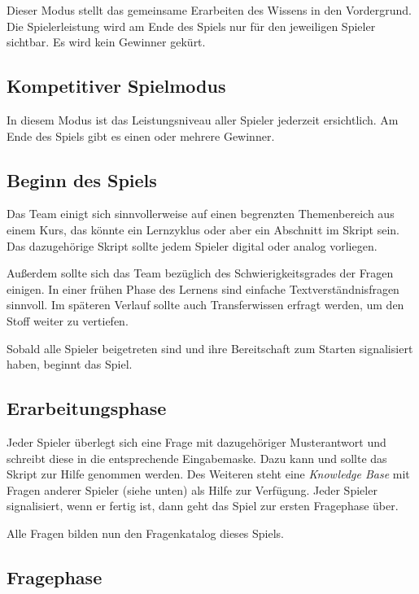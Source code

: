 \documentclass[a4paper,11pt,listof=numbered,glossary=totoc,parskip=half,toc=bib]{scrreprt}
\begin{document}
Dieser Modus stellt das gemeinsame Erarbeiten des Wissens in den Vordergrund. Die Spielerleistung wird am Ende des Spiels nur für den jeweiligen Spieler sichtbar. Es wird kein Gewinner gekürt.

\subsection{Kompetitiver Spielmodus}

In diesem Modus ist das Leistungsniveau aller Spieler jederzeit ersichtlich. Am Ende des Spiels gibt es einen oder mehrere Gewinner.


\subsection{Beginn des Spiels}

Das Team einigt sich sinnvollerweise auf einen begrenzten Themenbereich aus einem Kurs, das könnte ein Lernzyklus oder aber ein Abschnitt im Skript sein. Das dazugehörige Skript sollte jedem Spieler digital oder analog vorliegen.

Außerdem sollte sich das Team bezüglich des Schwierigkeitsgrades der Fragen einigen. In einer frühen Phase des Lernens sind einfache Textverständnisfragen sinnvoll. Im späteren Verlauf sollte auch Transferwissen erfragt werden, um den Stoff weiter zu vertiefen.

Sobald alle Spieler beigetreten sind und ihre Bereitschaft zum Starten signalisiert haben, beginnt das Spiel. 



\subsection{Erarbeitungsphase}

Jeder Spieler überlegt sich eine Frage mit dazugehöriger \frqq{}Musterantwort\flqq{} und schreibt diese in die entsprechende Eingabemaske. Dazu kann und sollte das Skript zur Hilfe genommen werden. Des Weiteren steht eine \textit{Knowledge Base} mit Fragen anderer Spieler (siehe unten) als Hilfe zur Verfügung. Jeder Spieler signalisiert, wenn er fertig ist, dann geht das Spiel zur ersten Fragephase über.

Alle Fragen bilden nun den Fragenkatalog dieses Spiels.

\subsection{Fragephase}
\end{document}
